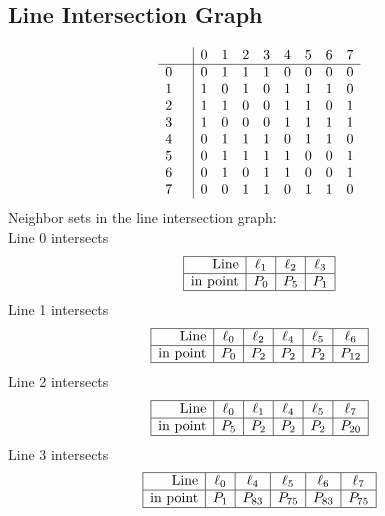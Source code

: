 \documentclass{article}
\begin{document}
{\subsection*{Line Intersection Graph}
{\arraycolsep=1pt
$$
\begin{array}{rr|*{8}r}
 &  & 0 & 1 & 2 & 3 & 4 & 5 & 6 & 7\\
\hline
0 &  & 0 & 1 & 1 & 1 & 0 & 0 & 0 & 0\\
1 &  & 1 & 0 & 1 & 0 & 1 & 1 & 1 & 0\\
2 &  & 1 & 1 & 0 & 0 & 1 & 1 & 0 & 1\\
3 &  & 1 & 0 & 0 & 0 & 1 & 1 & 1 & 1\\
4 &  & 0 & 1 & 1 & 1 & 0 & 1 & 1 & 0\\
5 &  & 0 & 1 & 1 & 1 & 1 & 0 & 0 & 1\\
6 &  & 0 & 1 & 0 & 1 & 1 & 0 & 0 & 1\\
7 &  & 0 & 0 & 1 & 1 & 0 & 1 & 1 & 0\\
\end{array}
$$
}%
Neighbor sets in the line intersection graph:\\
Line 0 intersects 
$$
\begin{array}{|r*{3}{|c}|}
\hline
\mbox{Line}  & \ell_{1} & \ell_{2} & \ell_{3}\\
\hline
\mbox{in point}  & P_{0} & P_{5} & P_{1}\\
\hline
\end{array}
$$
Line 1 intersects 
$$
\begin{array}{|r*{5}{|c}|}
\hline
\mbox{Line}  & \ell_{0} & \ell_{2} & \ell_{4} & \ell_{5} & \ell_{6}\\
\hline
\mbox{in point}  & P_{0} & P_{2} & P_{2} & P_{2} & P_{12}\\
\hline
\end{array}
$$
Line 2 intersects 
$$
\begin{array}{|r*{5}{|c}|}
\hline
\mbox{Line}  & \ell_{0} & \ell_{1} & \ell_{4} & \ell_{5} & \ell_{7}\\
\hline
\mbox{in point}  & P_{5} & P_{2} & P_{2} & P_{2} & P_{20}\\
\hline
\end{array}
$$
Line 3 intersects 
$$
\begin{array}{|r*{5}{|c}|}
\hline
\mbox{Line}  & \ell_{0} & \ell_{4} & \ell_{5} & \ell_{6} & \ell_{7}\\
\hline
\mbox{in point}  & P_{1} & P_{83} & P_{75} & P_{83} & P_{75}\\
\hline
\end{array}
$$}
\end{document}
